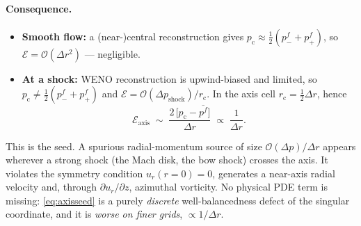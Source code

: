 \documentclass[11pt]{article}
\newcommand{\ur}{u_r}
\newcommand{\rhalf}{r_{\mathrm{c}}}
\begin{document}
\paragraph{Consequence.}
\begin{itemize}[leftmargin=1.6em,itemsep=2pt]
\item \textbf{Smooth flow:} a (near-)central reconstruction gives
      $p_{\mathrm c}\approx\tfrac12(p^{f}_-+p^{f}_+)$, so
      $\mathcal E=\mathcal O(\Delta r^2)$ --- negligible.
\item \textbf{At a shock:} WENO reconstruction is upwind-biased and limited,
      so $p_{\mathrm c}\neq\tfrac12(p^{f}_-+p^{f}_+)$ and
      $\mathcal E=\mathcal O(\Delta p_{\text{shock}})/\rhalf$.  In the axis
      cell $\rhalf=\tfrac12\Delta r$, hence
      \begin{equation}
      \mathcal E_{\text{axis}} \;\sim\;
      \frac{2\,\bigl[p_{\mathrm c}-\overline{p^{f}}\bigr]}{\Delta r}
      \;\propto\; \frac{1}{\Delta r}.
      \label{eq:axisseed}
      \end{equation}
\end{itemize}
\textcolor{seedred}{This is the seed.}  A spurious radial-momentum source
of size $\mathcal O(\Delta p)/\Delta r$ appears wherever a strong shock
(the Mach disk, the bow shock) crosses the axis.  It violates the
symmetry condition $\ur(r{=}0)=0$, generates a near-axis radial velocity
and, through $\partial \ur/\partial z$, azimuthal vorticity.  No physical
PDE term is missing: \eqref{eq:axisseed} is a purely \emph{discrete}
well-balancedness defect of the singular coordinate, and it is
\emph{worse on finer grids}, $\propto 1/\Delta r$.
\end{document}

